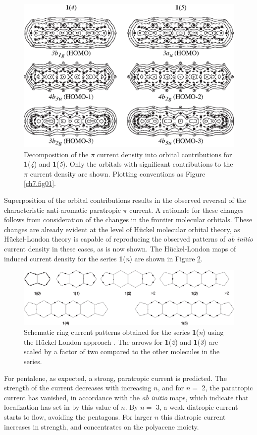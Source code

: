 \begin{figure}[hbp]
\center
\includegraphics{indacene/figures/figure3c.eps}
\caption{Decomposition of the $\pi$ current density into orbital contributions for \textbf{1}(\textit{4}) and \textbf{1}(\textit{5}). Only the orbitals with significant contributions to the $\pi$ current density are shown. Plotting conventions as Figure \ref{ch7.fig01}.}
\label{ch7.fig03c}
\end{figure}
Superposition of the orbital contributions results in the observed reversal of the characteristic anti-aromatic paratropic $\pi$ current. A rationale for these changes follows from consideration of the changes in the frontier molecular orbitals. These changes are already evident at the level of H\"uckel molecular orbital theory, as H\"uckel-London theory  \cite{r26,r27} is capable of reproducing the observed patterns of \textit{ab initio} current density in these cases, as is now shown.
\clearpage
\newpage
The H\"uckel-London  \cite{r26,r27} maps of induced current density for the series \textbf{1}(\textit{n}) are shown in Figure \ref{ch7.fig04}.
\begin{figure}[hb]
\center
\includegraphics[scale=0.78]{indacene/figures/figure4.eps}
\caption{Schematic ring current patterns obtained for the series \textbf{1}(\textit{n}) using the H\"uckel-London approach \cite{r26,r27}. The arrows for \textbf{1}(\textit{2}) and \textbf{1}(\textit{3}) are scaled by a factor of two compared to the other molecules in the series.}
\label{ch7.fig04}
\end{figure}
For pentalene, as expected, a strong, paratropic current is predicted. The strength of the current decreases with increasing $n$, and for {$n =$ 2}, the paratropic current has vanished, in accordance with the \textit{ab initio} maps, which indicate that localization has set in by this value of $n$. By {$n =$ 3}, a weak diatropic current starts to flow, avoiding the pentagons. For larger $n$ this diatropic current increases in strength, and concentrates on the polyacene moiety.

